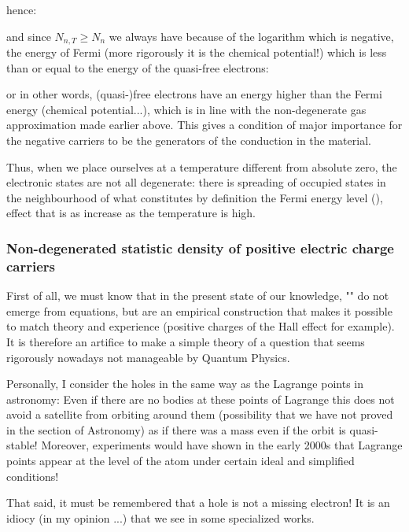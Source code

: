	hence:
	
	and since $N_{n,T}\ge N_n$ we always have because of the logarithm which is negative, the energy of Fermi (more rigorously it is the chemical potential!) which is less than or equal to the energy of the quasi-free electrons:
	
	or in other words, (quasi-)free electrons have an energy higher than the Fermi energy (chemical potential...), which is in line with the non-degenerate gas approximation made earlier above. This gives a condition of major importance for the negative carriers to be the generators of the conduction in the material.

	Thus, when we place ourselves at a temperature different from absolute zero, the electronic states are not all degenerate: there is spreading of occupied states in the neighbourhood of what constitutes by definition the Fermi energy level (), effect that is as increase as the temperature is high.
	
	\subsubsection{Non-degenerated statistic density of positive electric charge carriers}\label{non-degenerated statistic density of positive electric charge carriers}
	First of all, we must know that in the present state of our knowledge, "" do not emerge from equations, but are an empirical construction that makes it possible to match theory and experience (positive charges of the Hall effect for example). It is therefore an artifice to make a simple theory of a question that seems rigorously nowadays not manageable by Quantum Physics.

	Personally, I consider the holes in the same way as the Lagrange points in astronomy: Even if there are no bodies at these points of Lagrange this does not avoid a satellite from orbiting around them (possibility that we have not proved in the section of Astronomy) as if there was a mass even if the orbit is quasi-stable! Moreover, experiments would have shown in the early 2000s that Lagrange points appear at the level of the atom under certain ideal and simplified conditions!

	That said, it must be remembered that a hole is not a missing electron! It is an idiocy (in my opinion ...) that we see in some specialized works.

